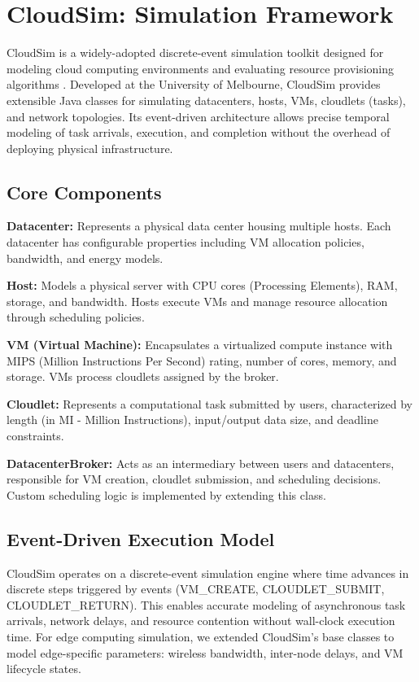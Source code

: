 \documentclass[12pt]{report}
\begin{document}
\section{CloudSim: Simulation Framework}

CloudSim is a widely-adopted discrete-event simulation toolkit designed for modeling cloud computing environments and evaluating resource provisioning algorithms \cite{cloudsim_2011}. Developed at the University of Melbourne, CloudSim provides extensible Java classes for simulating datacenters, hosts, VMs, cloudlets (tasks), and network topologies. Its event-driven architecture allows precise temporal modeling of task arrivals, execution, and completion without the overhead of deploying physical infrastructure.

\subsection{Core Components}

\textbf{Datacenter:} Represents a physical data center housing multiple hosts. Each datacenter has configurable properties including VM allocation policies, bandwidth, and energy models.

\textbf{Host:} Models a physical server with CPU cores (Processing Elements), RAM, storage, and bandwidth. Hosts execute VMs and manage resource allocation through scheduling policies.

\textbf{VM (Virtual Machine):} Encapsulates a virtualized compute instance with MIPS (Million Instructions Per Second) rating, number of cores, memory, and storage. VMs process cloudlets assigned by the broker.

\textbf{Cloudlet:} Represents a computational task submitted by users, characterized by length (in MI - Million Instructions), input/output data size, and deadline constraints.

\textbf{DatacenterBroker:} Acts as an intermediary between users and datacenters, responsible for VM creation, cloudlet submission, and scheduling decisions. Custom scheduling logic is implemented by extending this class.

\subsection{Event-Driven Execution Model}

CloudSim operates on a discrete-event simulation engine where time advances in discrete steps triggered by events (VM\_CREATE, CLOUDLET\_SUBMIT, CLOUDLET\_RETURN). This enables accurate modeling of asynchronous task arrivals, network delays, and resource contention without wall-clock execution time. For edge computing simulation, we extended CloudSim's base classes to model edge-specific parameters: wireless bandwidth, inter-node delays, and VM lifecycle states.
\end{document}
